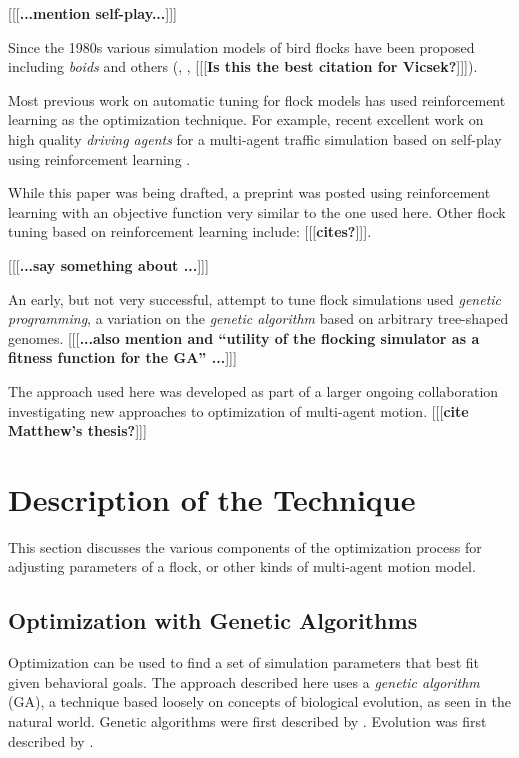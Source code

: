 \documentclass[letterpaper]{article}
\begin{document}
[[[\textbf{...mention self-play...}]]]

Since the 1980s various simulation models of bird flocks have been proposed including \textit{boids} \citep{reynolds_flocks_1987} and others (\citet{aoki_simulation_1982}, \citet{cucker_emergent_2007}, \citet{bhattacharya_collective_2010} [[[\textbf{Is this the best citation for Vicsek?}]]]).

Most previous work on automatic tuning for flock models has used reinforcement learning \citep{sutton_reinforcement_1998} as the optimization technique. For example, recent excellent work on high quality \textit{driving agents} for a multi-agent traffic simulation based on self-play using reinforcement learning \citep{cornelisse_building_2025}.

While this paper was being drafted, a preprint was posted \citep{brambati_learning_2025} using reinforcement learning with an objective function very similar to the one used here. Other flock tuning based on reinforcement learning include:
[[[\textbf{cites?}]]].

[[[\textbf{...say something about \citep{jaderberg_human-level_2019}...}]]]

An early, but not very successful, attempt to tune flock simulations \citep{reynolds_evolved_1993} used \textit{genetic programming}, a variation on the \textit{genetic algorithm} based on arbitrary tree-shaped genomes. [[[\textbf{...also mention \citep{stonedahl_finding_2011} and ``utility of the flocking simulator as a fitness function for the GA'' ...}]]]

The approach used here was developed as part of a larger ongoing collaboration investigating new approaches to optimization of multi-agent motion. [[[\textbf{cite Matthew's thesis?}]]]

\section{Description of the Technique}
\label{sec:Description}

This section discusses the various components of the optimization process for adjusting parameters of a flock, or other kinds of multi-agent motion model.

\subsection{Optimization with Genetic Algorithms}
\label{subsec:Optimization_with_GA}

Optimization can be used to find a set of simulation parameters that best fit given behavioral goals. The approach described here uses a \textit{genetic algorithm} (GA), a technique based loosely on concepts of biological evolution, as seen in the natural world. Genetic algorithms were first described by \citet{holland_adaptation_1975}. Evolution was first described by \citet{darwin_origin_1859}.
\end{document}
